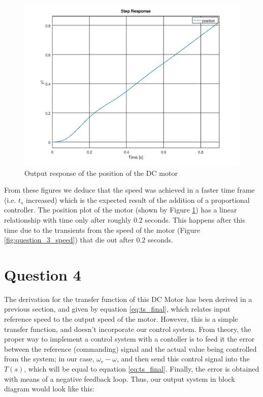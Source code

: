\documentclass[a4paper, 12pt]{article}
\begin{document}
\begin{figure}[H]
	\centering
	\includegraphics[width=\textwidth]{Images/question_3_pos.png}
	\caption{Output response of the position of the DC motor}
	\label{fig:question_3_pos}
\end{figure}

From these figures we deduce that the speed was achieved in a faster time frame (i.e. $t_s$ increased) which is the expected result of the addition of a proportional controller. The position plot of the motor (shown by Figure \ref{fig:question_3_pos}) has a linear relationship with time only after roughly $0.2$ seconds. This happens after this time due to the transients from the speed of the motor (Figure \ref{fig:question_3_speed}) that die out after $0.2$ seconds. 

\section{Question 4} %
\label{sec:question_4}

The derivation for the transfer function of this DC Motor has been derived in a
previous section, and given by equation \eqref{eq:ts_final}, which relates
input reference speed to the output speed of the motor. However, this is a
simple transfer function, and doesn't incorporate our control system. From
theory, the proper way to implement a control system with a contoller is to
feed it the error between the reference (commanding) signal and the actual
value being controlled from the system; in our case, $\omega_r - \omega$, and
then send this control signal into the $T(s)$, which will be equal to equation
\eqref{eq:ts_final}. Finally, the error is obtained with means of a negative
feedback loop. Thus, our output system in block diagram would look like this:
\end{document}
